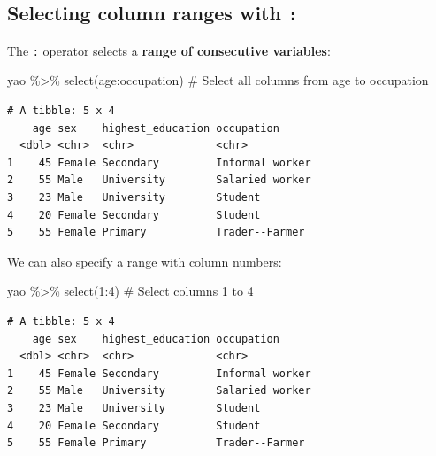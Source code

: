 \documentclass[
  letterpaper,
  DIV=11,
  numbers=noendperiod]{scrreprt}
\newenvironment{Shaded}{\begin{snugshade}}{\end{snugshade}}
\newcommand{\CommentTok}[1]{\textcolor[rgb]{0.37,0.37,0.37}{#1}}
\newcommand{\DecValTok}[1]{\textcolor[rgb]{0.68,0.00,0.00}{#1}}
\newcommand{\FunctionTok}[1]{\textcolor[rgb]{0.28,0.35,0.67}{#1}}
\newcommand{\NormalTok}[1]{\textcolor[rgb]{0.00,0.23,0.31}{#1}}
\newcommand{\SpecialCharTok}[1]{\textcolor[rgb]{0.37,0.37,0.37}{#1}}
\begin{document}
\hypertarget{selecting-column-ranges-with}{%
\subsection{\texorpdfstring{Selecting column ranges with
\texttt{:}}{Selecting column ranges with :}}\label{selecting-column-ranges-with}}

The \texttt{:} operator selects a \textbf{range of consecutive
variables}:

\begin{Shaded}
\begin{Highlighting}[]
\NormalTok{yao }\SpecialCharTok{\%\textgreater{}\%} \FunctionTok{select}\NormalTok{(age}\SpecialCharTok{:}\NormalTok{occupation) }\CommentTok{\# Select all columns from \textasciigrave{}age\textasciigrave{} to \textasciigrave{}occupation\textasciigrave{}}
\end{Highlighting}
\end{Shaded}

\begin{verbatim}
# A tibble: 5 x 4
    age sex    highest_education occupation     
  <dbl> <chr>  <chr>             <chr>          
1    45 Female Secondary         Informal worker
2    55 Male   University        Salaried worker
3    23 Male   University        Student        
4    20 Female Secondary         Student        
5    55 Female Primary           Trader--Farmer 
\end{verbatim}

We can also specify a range with column numbers:

\begin{Shaded}
\begin{Highlighting}[]
\NormalTok{yao }\SpecialCharTok{\%\textgreater{}\%} \FunctionTok{select}\NormalTok{(}\DecValTok{1}\SpecialCharTok{:}\DecValTok{4}\NormalTok{) }\CommentTok{\# Select columns 1 to 4}
\end{Highlighting}
\end{Shaded}

\begin{verbatim}
# A tibble: 5 x 4
    age sex    highest_education occupation     
  <dbl> <chr>  <chr>             <chr>          
1    45 Female Secondary         Informal worker
2    55 Male   University        Salaried worker
3    23 Male   University        Student        
4    20 Female Secondary         Student        
5    55 Female Primary           Trader--Farmer 
\end{verbatim}
\end{document}
